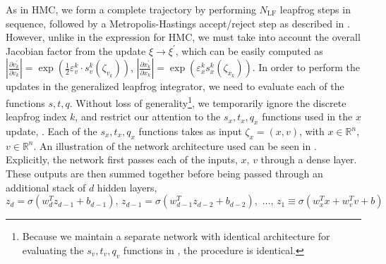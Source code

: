 \documentclass{article} %
\begin{document}
As in HMC, we form a complete trajectory by performing \(N_{\mathrm{LF}}\) leapfrog steps in sequence, followed by a Metropolis-Hastings accept/reject step as described in .
%
However, unlike in the expression for HMC, we must take into account the overall Jacobian factor from the update
\(\xi\rightarrow\xi^{\prime}\), which can be easily computed as \(\left|\tfrac{\partial v^{\prime}_{k}}{\partial
   v_{k}}\right| = \exp{\left(\tfrac{1}{2}{\varepsilon^{k}_{v}\cdot s^{k}_{v}(\zeta_{v_{k}})}\right)}\),
   \(\left|\tfrac{\partial x^{\prime}_{k}}{\partial x_{k}}\right| = \exp{\left(\varepsilon^{k}_{x}
   s^{k}_{x}(\zeta_{x_{k}})\right)}\).
%
%
In order to perform the updates in the generalized leapfrog integrator, we need to evaluate each of the functions
\(s, t, q\).
%
Without loss of generality\footnote{%
   Because we maintain a separate network with identical architecture for evaluating the \(s_{v}, t_{v}, q_{v}\)
   functions in , the procedure is identical.
},
%
we temporarily ignore the discrete leapfrog index \(k\), and restrict our attention to the \(s_{x}, t_{x}, q_{x}\)
functions used in the \(x\) update, .
%
Each of the \(s_{x}, t_{x}, q_{x}\) functions takes as input \(\zeta_{x} = (x, v)\), with \(x\in\mathbb{R}^{n}\),
\(v\in\mathbb{R}^{n}\).
%
An illustration of the network architecture used can be seen in .
%
Explicitly, the network first passes each of the inputs, \(x\), \(v\) through a dense layer.
%
These outputs are then summed together before being passed through an additional stack of \(d\) hidden layers, 
%
\begin{equation}
   z_{d} = \sigma(w^{T}_{d} z_{d-1} + b_{d-1}),\,%
   z_{d-1} = \sigma(w_{d-1}^{T}z_{d-2}+b_{d-2}),\,%
   \,\ldots,\,%
   z_{1} \equiv \sigma(w_{x}^{T} x + w_{v}^{T} v + b)
\end{equation}
\end{document}
